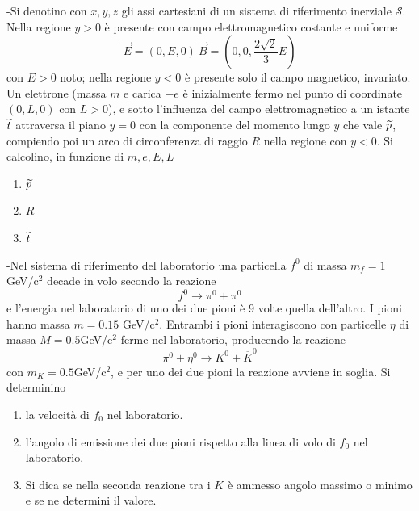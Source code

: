 \documentclass[12pt,twoside,a4]{article}
\begin{document}
\newpage
\begin{esercizio}[Esame 20-06-2013]
	-Si denotino con $x,y,z$ gli assi cartesiani di un sistema di riferimento inerziale $\mathcal{S}$. Nella regione $y > 0$ è presente con campo elettromagnetico costante e uniforme 
$$ \vec{E} = (0,E,0)  \  \vec{B} = (0,0,\frac{2\sqrt{2}}{3}E)$$ con $E > 0$ noto; nella regione $y <0 $ è presente solo il campo magnetico, invariato. Un elettrone (massa $m$ e carica $-e$ è inizialmente fermo nel punto di coordinate $(0,L,0)$ con $L>0$), e sotto l'influenza del campo elettromagnetico a un istante $\widetilde{t}$ attraversa il piano $y=0$ con la componente del momento lungo $y$ che vale $\widetilde{p}$, compiendo poi un arco di circonferenza di raggio $R$ nella regione con $y < 0$. Si calcolino, in funzione di $m,e,E,L$
\begin{enumerate}[label=(\textit{\roman*})]
\item $\widetilde{p}$
\item $R$
\item $\widetilde{t}$
\end{enumerate}
\end{esercizio}

\begin{esercizio}[Esame 05-09-2013]
	-Nel sistema di riferimento del laboratorio una particella $f^0$ di massa $m_f = 1$ GeV/c$^2$ decade in volo secondo la reazione
$$ f^0 \longrightarrow \pi^0 + \pi^0$$
e l'energia nel laboratorio di uno dei due pioni è 9 volte quella dell'altro. I pioni hanno massa $m = 0.15$ GeV/c$^2$. Entrambi i pioni interagiscono con particelle $\eta$ di massa $M = 0.5$GeV/c$^2$ ferme nel laboratorio, producendo la reazione
$$\pi^0 + \eta^0 \longrightarrow  K^0 + \overline{K}^0$$
con $m_K = 0.5$GeV/c$^2$, e per uno dei due pioni la reazione avviene in soglia. Si determinino
\begin{enumerate}[label=(\textit{\roman*})]
\item la velocità  di $f_0$ nel laboratorio.
\item l'angolo di emissione dei due pioni rispetto alla linea di volo di $f_0$ nel laboratorio.
\item Si dica se nella seconda reazione tra i $K$ è ammesso angolo massimo o minimo e se ne determini il valore.
\end{enumerate}
\end{esercizio}
\end{document}
